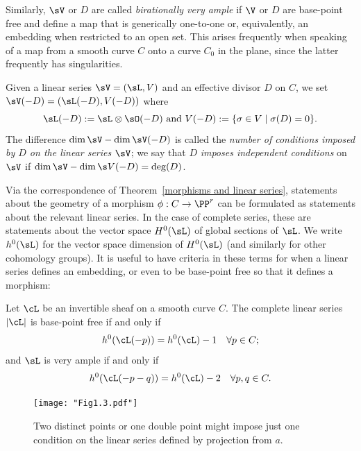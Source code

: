 Similarly, $\sV$ or $D$ are called \emph{birationally very ample}
if $\V$ or $D$ are base-point free and define a map that is generically one-to-one or, equivalently,
an embedding when restricted to an open set. This arises frequently when speaking of a map from a smooth
curve $C$ onto a curve $C_{0}$ in the plane, since the latter frequently has singularities.

Given a linear series $\sV = (\sL, V)$ and an effective divisor $D$ on $C$, we  set
$
\sV(-D) = (\sL(-D),V(-D))
$
where
$$
\sL(-D): = \sL \otimes \sO(-D)\hbox{ and } V(-D) := \{ \sigma \in V \mid \sigma(D) = 0 \}.
$$
The difference $\dim \sV - \dim \sV(-D)$ is called the \emph{number of conditions imposed by $D$ on the linear series $\sV$}; we say that $D$ \emph{imposes independent conditions} on $\sV$ if $\dim \sV - \dim \s V(-D) = \deg(D)$.

Via the correspondence of Theorem~\ref{morphisms and linear series}, statements about the geometry of a morphism $\phi : C \to \PP^r$ can be formulated as statements about the relevant linear series. In the case of complete series, these are statements about the vector space $H^{0}(\sL)$ of global sections of $\sL$. We write $h^{0}(\sL)$ for the vector space dimension of $H^0(\sL)$ (and similarly for other cohomology groups). It is useful to have criteria
in these terms for when a linear series defines an embedding, or even to be base-point free so that it
defines a morphism:

\begin{proposition}\label{very ample}\cite[Thm. IV.3.1]{Hartshorne1977}
Let $\cL$ be an invertible sheaf on a smooth curve $C$. The complete linear series $|\cL|$ is base-point free if and only if
$$
h^0(\cL(-p)) = h^0(\cL) - 1 \quad \forall p \in C;
$$
and $\sL$ is very ample if and only if
$$
h^0(\cL(-p-q)) = h^0(\cL) - 2 \quad \forall p, q \in C.
$$
\end{proposition} 

\begin{figure}
 \caption{Two distinct points or one double point might impose just one condition on the linear series defined by projection from $a$.}
\centerline {\texttt{[image: "Fig1.3.pdf"]}}
\end{figure}

